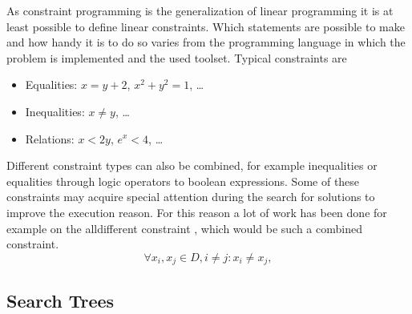 \documentclass[10pt,
               a4paper,
               journal,
               ]{IEEEtran}
\begin{document}
	As constraint programming is the generalization of linear programming it is at least possible to define linear constraints. Which statements are possible to make and how handy it is to do so varies from the programming language in which the problem is implemented and the used toolset. Typical constraints are
	\begin{itemize}
		\item Equalities: $x = y + 2$, $x^2 + y^2 = 1$, \dots
		\item Inequalities: $x \ne y$, \dots
		\item Relations: $x < 2 y$, $e^x < 4$, \dots
	\end{itemize}
	
	Different constraint types can also be combined, for example inequalities or equalities through logic operators to boolean expressions. Some of these constraints may acquire special attention during the search for solutions to improve the execution reason. For this reason a lot of work has been done for example on the alldifferent constraint \cite{allDifferent}, which would be such a combined constraint.
	\begin{equation}
		\forall x_i, x_j \in D, i \ne j: x_i \ne x_j, 
		\label{eq:alldifferent}
	\end{equation}
	
	\subsection{Search Trees}
	
\end{document}

